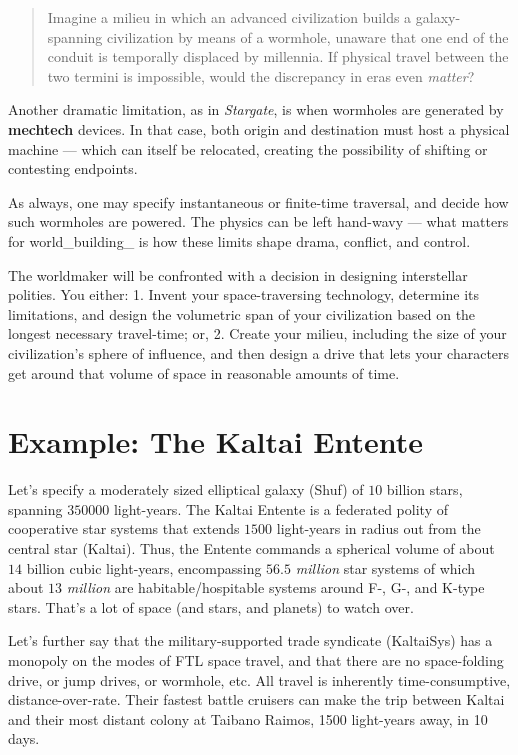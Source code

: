 \documentclass[
  letterpaper,
]{book}
\begin{document}
\begin{quote}
Imagine a milieu in which an advanced civilization builds a
galaxy-spanning civilization by means of a wormhole, unaware that one
end of the conduit is temporally displaced by millennia. If physical
travel between the two termini is impossible, would the discrepancy in
eras even \emph{matter}?
\end{quote}

Another dramatic limitation, as in \emph{Stargate}, is when wormholes
are generated by \textbf{mechtech} devices. In that case, both origin
and destination must host a physical machine --- which can itself be
relocated, creating the possibility of shifting or contesting endpoints.

As always, one may specify instantaneous or finite-time traversal, and
decide how such wormholes are powered. The physics can be left hand-wavy
--- what matters for world\_building\_ is how these limits shape drama,
conflict, and control.

The worldmaker will be confronted with a decision in designing
interstellar polities. You either: 1. Invent your space-traversing
technology, determine its limitations, and design the volumetric span of
your civilization based on the longest necessary travel-time; or, 2.
Create your milieu, including the size of your civilization's sphere of
influence, and then design a drive that lets your characters get around
that volume of space in reasonable amounts of time.

\section{Example: The Kaltai Entente}\label{example-the-kaltai-entente}

Let's specify a moderately sized elliptical galaxy (Shuf) of \(10\)
billion stars, spanning \(350000\) light-years. The Kaltai Entente is a
federated polity of cooperative star systems that extends \(1500\)
light-years in radius out from the central star (Kaltai). Thus, the
Entente commands a spherical volume of about \(14\) billion cubic
light-years, encompassing \(56.5\) \emph{million} star systems of which
about \(13\) \emph{million} are habitable/hospitable systems around F-,
G-, and K-type stars. That's a lot of space (and stars, and planets) to
watch over.

Let's further say that the military-supported trade syndicate
(KaltaiSys) has a monopoly on the modes of FTL space travel, and that
there are no space-folding drive, or jump drives, or wormhole, etc. All
travel is inherently time-consumptive, distance-over-rate. Their fastest
battle cruisers can make the trip between Kaltai and their most distant
colony at Taibano Raimos, 1500 light-years away, in 10 days.
\end{document}
